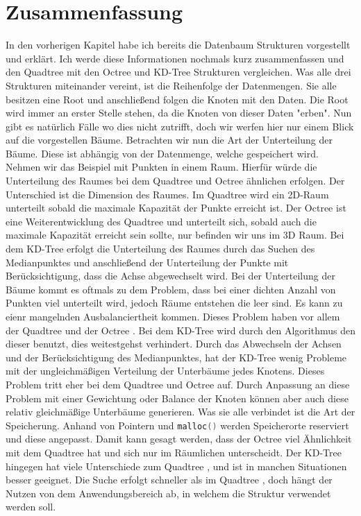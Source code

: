 \documentclass[11pt]{article}
\newcommand{\qt}{Quadtree }
\newcommand{\oc}{Octree }
\newcommand{\kd}{KD-Tree }
\newcommand{\lstin}[1]{\lstinline[language=C]{#1}}
\begin{document}
\section{Zusammenfassung}
In den vorherigen Kapitel habe ich bereits die Datenbaum Strukturen vorgestellt und erklärt. Ich werde diese Informationen nochmals kurz zusammenfassen und den \qt mit den \oc und \kd Strukturen vergleichen. 
\newline    
Was alle drei Strukturen miteinander vereint, ist die Reihenfolge der Datenmengen. Sie alle besitzen eine Root und anschließend folgen die Knoten mit den Daten. Die Root wird immer an erster Stelle stehen, da die Knoten von dieser Daten "erben". Nun gibt es natürlich Fälle wo dies nicht zutrifft, doch wir werfen hier nur einem Blick auf die vorgestellen Bäume. 
\newline
Betrachten wir nun die Art der Unterteilung der Bäume. Diese ist abhängig von der Datenmenge, welche gespeichert wird. Nehmen wir das Beispiel mit Punkten in einem Raum. Hierfür würde die Unterteilung des Raumes bei dem \qt und \oc ähnlichen erfolgen. 
Der Unterschied ist die Dimension des Raumes. Im \qt wird ein 2D-Raum unterteilt sobald die maximale Kapazität der Punkte erreicht ist. Der \oc ist eine Weiterentwicklung des \qt und unterteilt sich, sobald auch die maximale Kapazität erreicht sein sollte, nur befinden wir uns im 3D Raum. 
Bei dem \kd erfolgt die Unterteilung des Raumes durch das Suchen des Medianpunktes und anschließend der Unterteilung der Punkte mit Berücksichtigung, dass die Achse abgewechselt wird.  \newline
Bei der Unterteilung der Bäume kommt es oftmals zu dem Problem, dass bei einer dichten Anzahl von Punkten viel unterteilt wird, jedoch Räume entstehen die leer sind. Es kann zu eienr mangelnden Ausbalanciertheit kommen.
Dieses Problem haben vor allem der \qt und der \oc. Bei dem \kd wird durch den Algorithmus den dieser benutzt, dies weitestgehst verhindert. \newline 
Durch das Abwechseln der Achsen und der Berücksichtigung des Medianpunktes, hat der \kd wenig Probleme mit der ungleichmäßigen Verteilung der Unterbäume jedes Knotens. Dieses Problem tritt eher bei dem \qt und \oc auf. Durch Anpassung an diese Problem mit einer Gewichtung oder Balance der Knoten können aber auch diese relativ gleichmäßige Unterbäume generieren.\newline
Was sie alle verbindet ist die Art der Speicherung. Anhand von Pointern und \lstin{malloc()} werden Speicherorte reserviert und diese angepasst. 
Damit kann gesagt werden, dass der \oc viel Ähnlichkeit mit dem \qt hat und sich nur im Räumlichen unterscheidt. Der \kd hingegen hat viele Unterschiede zum \qt, und ist in manchen Situationen besser geeignet. Die Suche erfolgt schneller als im \qt , doch hängt der Nutzen von dem Anwendungsbereich ab, in welchem die Struktur verwendet werden soll. 
\end{document}
